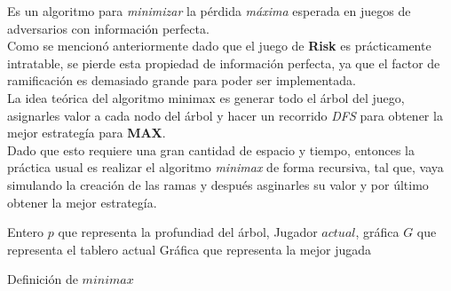 \documentclass[12pt]{article}
\begin{document}
Es un algoritmo para \textit{minimizar} la p\'erdida \textit{m\'axima} esperada en juegos de adversarios con
informaci\'on perfecta.\\

Como se mencion\'o anteriormente dado que el juego de \textbf{Risk} es pr\'acticamente intratable, se pierde esta propiedad
de informaci\'on perfecta, ya que el factor de ramificaci\'on es demasiado grande para poder ser implementada.\\

La idea te\'orica del algoritmo minimax es generar todo el \'arbol del juego, asignarles valor a cada
nodo del \'arbol y hacer un recorrido \textit{DFS} para obtener la mejor estrateg\'ia para \textbf{MAX}.\\

Dado que esto requiere una gran cantidad de espacio y tiempo, entonces la pr\'actica usual es realizar
el algoritmo \textit{minimax} de forma recursiva, tal que, vaya simulando la creaci\'on de las ramas y despu\'es
asginarles su valor y por \'ultimo obtener la mejor estrateg\'ia.\\
\newpage
\begin{algorithm}
\begin{algorithmic}[1]
\REQUIRE Entero $p$ que representa la profundiad del \'arbol, Jugador $actual$, gr\'afica $G$ que representa el tablero actual
\ENSURE  Gr\'afica que representa la mejor jugada
\ELSE
{}
\ENDIF
{}
\ELSE
{}
\ENDIF
{}
\ELSE
{}
\ENDIF
\ELSE
{}
\ENDIF
\ENDIF
\ENDFOR
\ENDIF
{}
\end{algorithmic}
\caption{Definici\'on de $minimax$}
\label{minimax}
\end{algorithm}
\end{document}
